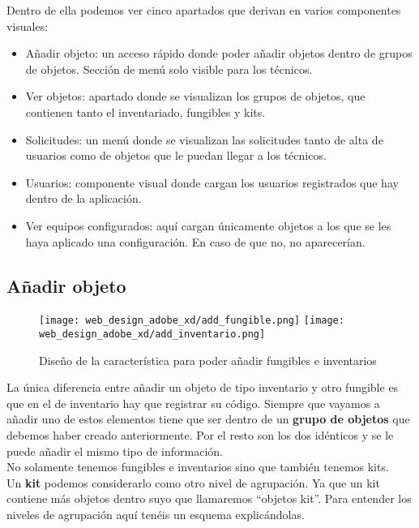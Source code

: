 Dentro de ella podemos ver cinco apartados que derivan en varios componentes visuales:

\begin{itemize}
    \item Añadir objeto: un acceso rápido donde poder añadir objetos dentro de grupos de objetos. Sección de menú solo visible para los técnicos.
    \item Ver objetos: apartado donde se visualizan los grupos de objetos, que contienen tanto el inventariado, fungibles y kits.
    \item Solicitudes: un menú donde se visualizan las solicitudes tanto de alta de usuarios como de objetos que le puedan llegar a los técnicos.
    \item Usuarios: componente visual donde cargan los usuarios registrados que hay dentro de la aplicación.
    \item Ver equipos configurados: aquí cargan únicamente objetos a los que se les haya aplicado una configuración. En caso de que no, no aparecerían.
\end{itemize}

\subsection{Añadir objeto}

\begin{figure}
    \begin{center}
        \texttt{[image: web\_design\_adobe\_xd/add\_fungible.png]}
        \texttt{[image: web\_design\_adobe\_xd/add\_inventario.png]}
        \caption{Diseño de la característica para poder añadir fungibles e inventarios}
    \end{center}
\end{figure}

La única diferencia entre añadir un objeto de tipo inventario y otro fungible es que en el de inventario hay que registrar su código. Siempre que vayamos a añadir uno de estos elementos tiene que ser dentro de un \textbf{grupo de objetos} que debemos haber creado anteriormente. Por el resto son los dos idénticos y se le puede añadir el mismo tipo de información.
\\No solamente tenemos fungibles e inventarios sino que también tenemos kits.
\\Un \textbf{kit} podemos considerarlo como otro nivel de agrupación. Ya que un kit contiene más objetos dentro suyo que llamaremos ``objetos kit''. Para entender los niveles de agrupación aquí tenéis un esquema explicándolas.

